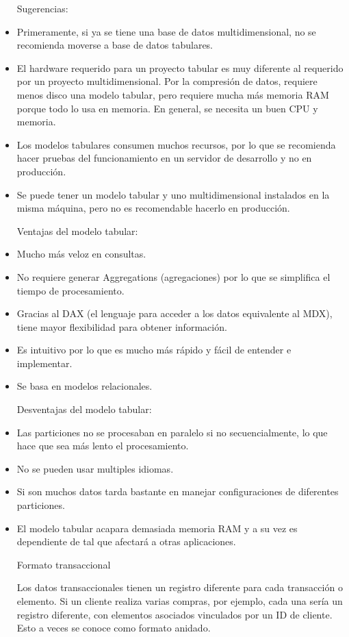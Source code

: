 \begin{itemize}
Sugerencias:

\item  Primeramente, si ya se tiene una base de datos multidimensional, no se recomienda moverse a base de datos tabulares.
\item El hardware requerido para un proyecto tabular es muy diferente al requerido por un proyecto multidimensional. Por la compresión de datos, requiere menos disco una modelo tabular, pero requiere mucha más memoria RAM porque todo lo usa en memoria. En general, se necesita un buen CPU y memoria.
\item Los modelos tabulares consumen muchos recursos, por lo que se recomienda hacer pruebas del funcionamiento en un servidor de desarrollo y no en producción.
\item Se puede tener un modelo tabular y uno multidimensional instalados en la misma máquina, pero no es recomendable hacerlo en producción.

Ventajas del modelo tabular:

\item Mucho más veloz en consultas.
\item No requiere generar Aggregations (agregaciones) por lo que se simplifica el tiempo de procesamiento.
\item Gracias al DAX (el lenguaje para acceder a los datos equivalente al MDX), tiene mayor flexibilidad para obtener información.
\item Es intuitivo por lo que es mucho más rápido y fácil de entender e implementar.
\item Se basa en modelos relacionales.

Desventajas del modelo tabular:

\item  Las particiones no se procesaban en paralelo si no secuencialmente, lo que hace que sea más lento el procesamiento.
\item No se pueden usar multiples idiomas.
\item Si son muchos datos tarda bastante en manejar configuraciones de diferentes particiones.
\item El modelo tabular acapara demasiada memoria RAM y a su vez es dependiente de tal que afectará a otras aplicaciones.

Formato transaccional

Los datos transaccionales tienen un registro diferente para cada transacción o elemento. Si un cliente realiza varias compras, por ejemplo, cada una sería un registro diferente, con elementos asociados vinculados por un ID de cliente. Esto a veces se conoce como formato anidado.


\end{itemize}
